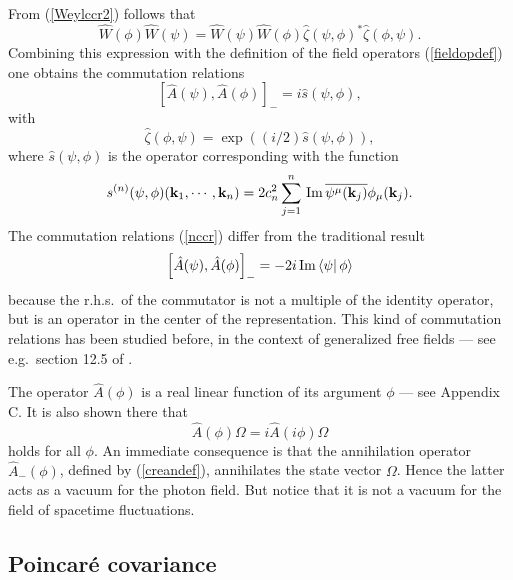 \documentclass[12pt,a4paper]{article}
\def\kk{{\bf k}}
\renewcommand{\Im}{\,{\rm Im}\,}
\begin{document}
From (\ref{Weylccr2}) follows that
\begin{equation}
\hat W(\phi)\hat W(\psi)=
\hat W(\psi)\hat W(\phi)\hat\zeta(\psi,\phi)^*\hat\zeta(\phi,\psi).
\end{equation}
Combining this expression with the definition of the field operators (\ref{fieldopdef})
one obtains the commutation relations
\begin{equation}
\left[\hat A(\psi),\hat A(\phi)\right]_-
=i\hat s(\psi,\phi),
\label{nccr}
\end{equation}
with
\begin{equation}
\hat\zeta(\phi,\psi)=\exp((i/2)\hat s(\psi,\phi)),
\end{equation}
where $\hat s(\psi,\phi)$ is the operator corresponding with the function
\begin{equation}
s^{(n)}(\psi,\phi)(\kk_1,\cdots,\kk_n)
=2c_n^2\sum_{j=1}^n\Im\overline {\psi^\mu(\kk_j)}\phi_\mu(\kk_j).
\end{equation}
The commutation relations (\ref{nccr}) differ from the traditional
result
\begin{equation}
\left[\hat A(\psi),\hat A(\phi)\right]_-
=-2i\Im\langle\psi|\,\phi\rangle
\end{equation}
because the r.h.s.~of the commutator is not a multiple of
the identity operator, but is an operator in the
center of the representation. This kind of commutation relations
has been studied before, in the context of
generalized free fields --- see e.g.~section 12.5 of \cite {BLT75}.

The operator $\hat A(\phi)$ is a real linear function of its
argument $\phi$ --- see Appendix C. It is also shown there that
\begin{equation}
\hat A(\phi)\Omega=i\hat A(i\phi)\Omega
\label{idep}
\end{equation}
holds for all $\phi$.
An immediate consequence is that the annihilation operator $\hat A_-(\phi)$,
defined by (\ref{creandef}), annihilates the state vector $\Omega$. Hence the latter acts
as a vacuum for the photon field. But notice that it is not a vacuum for the field
of spacetime fluctuations.


\subsection{Poincar\'e covariance}
\end{document}
